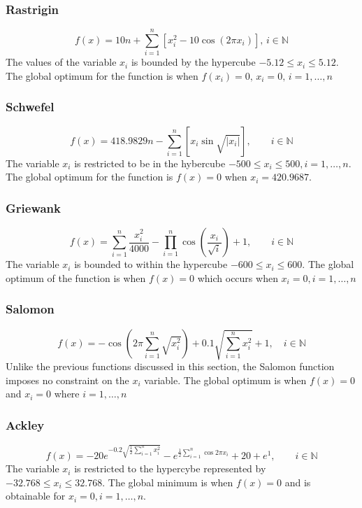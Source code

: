 \subsubsection{Rastrigin}
\begin{equation}
	f(x) = 10n + \sum_{i=1}^n [x_i^2 - 10\cos(2 \pi x_i)],\, i \in \mathbb{N}
\end{equation}
The values of the variable $x_i$ is bounded by the hypercube $-5.12 \leq x_i \leq 5.12$. The global optimum for the function is when $f(x_i) = 0,\, x_i = 0, \, i = 1,\dots,n$
\subsubsection{Schwefel}
\begin{equation}
	f(x) = 418.9829n - \sum^n_{i=1} [x_i\sin{\sqrt{|x_i|}}], \qquad i \in \mathbb{N}
\end{equation}
The variable $x_i$ is restricted to be in the hybercube $-500 \leq x_i \leq 500, i = 1,\ldots,n$. The global optimum for the function is $f(x) = 0$ when $x_i = 420.9687$.
\subsubsection{Griewank}
\begin{equation}
	f(x) = \sum^n_{i=1} \frac{x^2_i}{4000} - \prod^n_{i=1}\cos{(\frac{x_i}{\sqrt{i}})} + 1, \qquad i \in \mathbb{N}
\end{equation}
The variable $x_i$ is bounded to within the hypercube $ -600 \leq x_i \leq 600 $. The global optimum of the function is when $f(x) =0$ which occurs when $ x_i = 0, i = 1, \dots, n $
\subsubsection{Salomon}
\begin{equation}
	f(x) = -\cos{(2\pi\sum_{i=1}^n\sqrt{x_i^2})} + 0.1 \sqrt{\sum_{i=1}^n x_i^2} + 1, \quad i \in \mathbb{N}
\end{equation}
Unlike the previous functions discussed in this section, the Salomon function imposes no constraint on the $x_i$ variable. The global optimum is when $f(x) = 0$ and $x_i = 0$ where $i = 1,\ldots,n$
\subsubsection{Ackley}
\begin{equation}
	f(x) = -20e^{-0.2\sqrt{\frac{1}{2}\sum_{i=1}^n x_i^2}} - e^{\frac{1}{2}\sum_{i=1}^n\cos{2\pi x_i}} + 20 + e^1, \qquad i \in \mathbb{N}
\end{equation}
The variable $x_i$ is restricted to the hypercybe represented by $-32.768 \leq x_i \leq 32.768$. The global minimum is when $f(x) = 0$ and is obtainable for $x_i = 0, i = 1,\ldots,n$.
